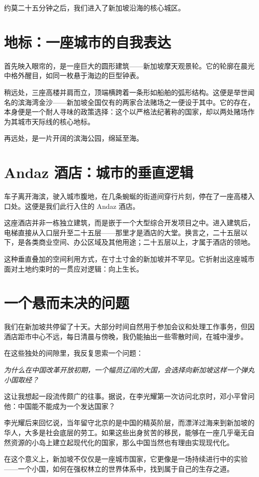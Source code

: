约莫二十五分钟之后，我们进入了新加坡沿海的核心城区。

\section{地标：一座城市的自我表达}

首先映入眼帘的，是一座巨大的圆形建筑——新加坡摩天观景轮。它的轮廓在晨光中格外醒目，如同一枚悬于海边的巨型钟表。

稍远处，三座高楼并肩而立，顶端横跨着一条形如船舶的弧形结构。这便是举世闻名的滨海湾金沙——新加坡全国仅有的两家合法赌场之一便设于其中。它的存在，本身便是一个耐人寻味的政策选择：这个以严格法纪著称的国家，却以两处赌场作为其城市天际线的核心地标。

再远处，是一片开阔的滨海公园，绵延至海。

\section{Andaz 酒店：城市的垂直逻辑}

车子离开海滨，驶入城市腹地，在几条蜿蜒的街道间穿行片刻，停在了一座高楼入口处。这便是我们此行入住的 Andaz 酒店。

这座酒店并非一栋独立建筑，而是嵌于一个大型综合开发项目之中。进入建筑后，电梯直接从入口层升至二十五层——那里才是酒店的大堂。换言之，二十五层以下，是各类商业空间、办公区域及其他用途；二十五层以上，才属于酒店的领地。

这种垂直叠加的空间利用方式，在寸土寸金的新加坡并不罕见。它折射出这座城市面对土地约束时的一贯应对逻辑：向上生长。

\section{一个悬而未决的问题}

我们在新加坡共停留了十天。大部分时间自然用于参加会议和处理工作事务，但因酒店距市中心不远，每日清晨与傍晚，我仍能抽出一些零散时间，在城中漫步。

在这些独处的间隙里，我反复思索一个问题：

\begin{center}
\textit{为什么在中国改革开放初期，一个幅员辽阔的大国，会选择向新加坡这样一个弹丸小国取经？}
\end{center}

这让我想起一段流传颇广的往事。据说，在李光耀第一次访问北京时，邓小平曾问他：中国能不能成为一个发达国家？

李光耀后来回忆说，当年留守北京的是中国的精英阶层，而漂洋过海来到新加坡的华人，大多是社会底层的劳工。如果这些出身贫苦的移民，能够在一座几乎毫无自然资源的小岛上建立起现代化的国家，那么中国当然也有理由实现现代化。

在这个意义上，新加坡不仅仅是一座城市国家，它更像是一场持续进行中的实验——一个小国，如何在强权林立的世界体系中，找到属于自己的生存之道。
